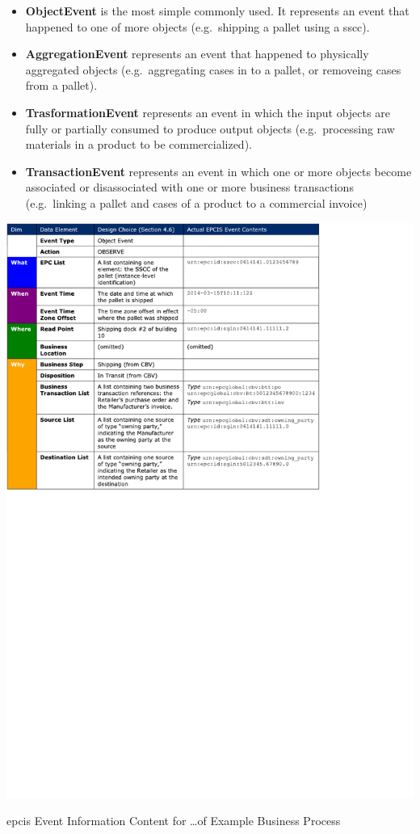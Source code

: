 \begin{itemize}
    \item \textbf{ObjectEvent} is the most simple commonly used. It represents an event that happened to one of more objects (e.g.\ shipping a pallet using a \ac{sscc}).
    \item \textbf{AggregationEvent} represents an event that happened to physically aggregated objects (e.g.\ aggregating cases in to a pallet, or removeing cases from a pallet).
    \item \textbf{TrasformationEvent} represents an event in which the input objects are fully or partially consumed to produce output objects (e.g.\ processing raw materials in a product to be commercialized).
    \item \textbf{TransactionEvent} represents an event in which one or more objects become associated or disassociated with one or more business transactions (e.g.\ linking a pallet and cases of a product to a commercial invoice)
\end{itemize}

\begin{table}[]
    \centering
    \includegraphics[width=\textwidth]{./figs/02-state-of-the-art/epcis_data_visibility.pdf}
    \caption{\ac{epcis} Event Information Content for \dots of Example Business Process~\cite{EPCISGuidelines}} 
    \label{tab:epciseventinfo}
\end{table}

